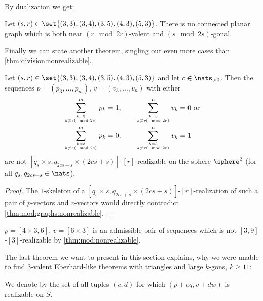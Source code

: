 By dualization we get:
\begin{corollary} Let $(s, r) \in \set{(3, 3), (3, 4), (3, 5), (4, 3), (5, 3)}$. There is no connected planar graph which is both near $(r \mod 2r)$-valent and $(s \mod 2s)$-gonal.
\end{corollary}

Finally we can state another theorem, singling out even more cases than \autoref{thm:division:nonrealizable}.

\begin{corollary}\label{thm:mod:nonrealizable}
  Let $(s, r) \in \set{(3, 3), (3, 4), (3, 5), (4, 3), (5, 3)}$ and let $c \in \nats_{> 0}$. Then the sequences $p = (p_3, \dots, p_m)$, $v = (v_3, \dots, v_n)$ with either
  \begin{align*}
    \sum_{k = 3 \atop k \not\equiv s (\mod 2s)}^m p_k = 1, \qquad&\sum_{k = 3 \atop k \not\equiv r (\mod 2r)}^n v_k = 0 \text{~or} \\
    \sum_{k = 3 \atop k \not\equiv s (\mod 2s)}^m p_k = 0, \qquad&\sum_{k = 3 \atop k \not\equiv r (\mod 2r)}^n v_k = 1
  \end{align*}
  are not $[q_s \times s, q_{2cs + s} \times (2cs + s)]$-$[r]$-realizable on the sphere $\sphere^2$ (for all $q_s, q_{2cs + s} \in \nats$).
\begin{proof}
  The $1$-skeleton of a $[q_s \times s, q_{2cs + s} \times (2cs + s)]$-$[r]$-realization of such a pair of $p$-vectors and $v$-vectors would directly contradict \autoref{thm:mod:graphs:nonrealizable}.
\end{proof}
\end{corollary}

\begin{example}
  $p = [4 \times 3, 6]$, $v = [6 \times 3]$ is an admissible pair of sequences which is not $[3, 9]$-$[3]$-realizable by \autoref{thm:mod:nonrealizable}.
\end{example}

The last theorem we want to present in this section explains, why we were unable to find $3$-valent {\sc Eberhard}-like theorems with triangles and large $k$-gons, $k \geq 11$:

\begin{definition}
  We denote by  the set of all tuples $(c, d)$ for which $(p + c q, v + d w)$ is realizable on $S$.
\end{definition}

